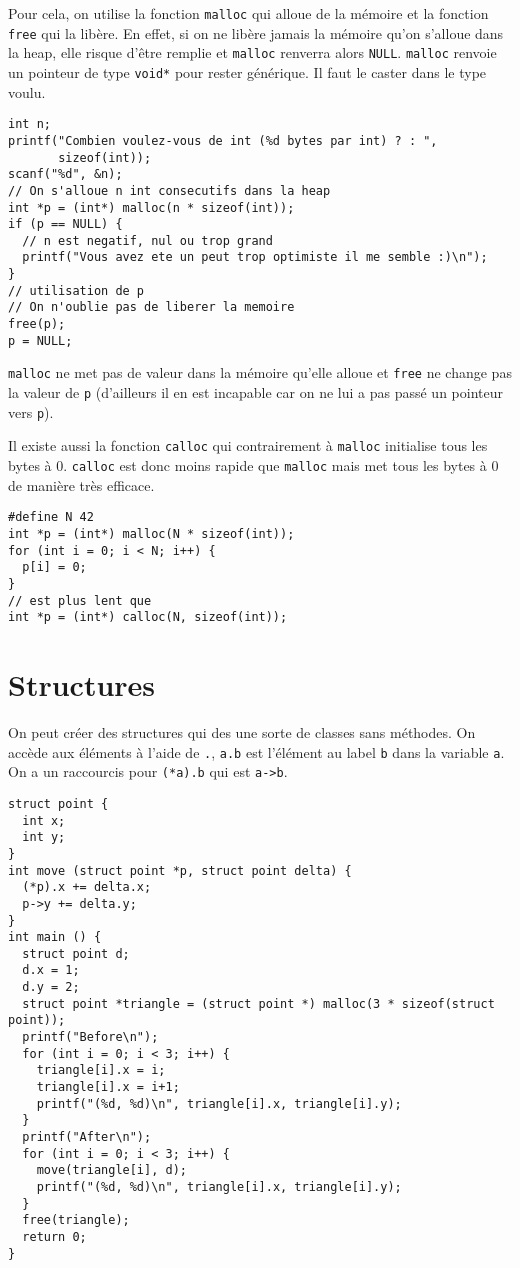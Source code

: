 Pour cela, on utilise la fonction \lstinline|malloc| qui alloue de la mémoire
et la fonction \lstinline|free| qui la libère.
En effet, si on ne libère jamais la mémoire qu'on s'alloue dans la heap,
elle risque d'être remplie et \lstinline|malloc| renverra alors
\lstinline|NULL|.
\lstinline|malloc| renvoie un pointeur de type \lstinline|void*|
pour rester générique.
Il faut le caster dans le type voulu.
\begin{lstlisting}
int n;
printf("Combien voulez-vous de int (%d bytes par int) ? : ",
       sizeof(int));
scanf("%d", &n);
// On s'alloue n int consecutifs dans la heap
int *p = (int*) malloc(n * sizeof(int));
if (p == NULL) {
  // n est negatif, nul ou trop grand
  printf("Vous avez ete un peut trop optimiste il me semble :)\n");
}
// utilisation de p
// On n'oublie pas de liberer la memoire
free(p);
p = NULL;
\end{lstlisting}

\lstinline|malloc| ne met pas de valeur dans la mémoire qu'elle alloue
et \lstinline|free| ne change pas la valeur de \lstinline|p|
(d'ailleurs il en est incapable car on ne lui a pas passé un pointeur
vers \lstinline|p|).

Il existe aussi la fonction \lstinline|calloc| qui contrairement à
\lstinline|malloc| initialise tous les bytes à 0.
\lstinline|calloc| est donc moins rapide que \lstinline|malloc| mais
met tous les bytes à 0 de manière très efficace.
\begin{lstlisting}
#define N 42
int *p = (int*) malloc(N * sizeof(int));
for (int i = 0; i < N; i++) {
  p[i] = 0;
}
// est plus lent que
int *p = (int*) calloc(N, sizeof(int));
\end{lstlisting}

\section{Structures}
On peut créer des structures qui des une sorte de classes sans méthodes.
On accède aux éléments à l'aide de \lstinline|.|, \lstinline|a.b|
est l'élément au label \lstinline|b| dans la variable \lstinline|a|.
On a un raccourcis pour \lstinline|(*a).b| qui est \lstinline|a->b|.
\begin{lstlisting}
struct point {
  int x;
  int y;
}
int move (struct point *p, struct point delta) {
  (*p).x += delta.x;
  p->y += delta.y;
}
int main () {
  struct point d;
  d.x = 1;
  d.y = 2;
  struct point *triangle = (struct point *) malloc(3 * sizeof(struct point));
  printf("Before\n");
  for (int i = 0; i < 3; i++) {
    triangle[i].x = i;
    triangle[i].x = i+1;
    printf("(%d, %d)\n", triangle[i].x, triangle[i].y);
  }
  printf("After\n");
  for (int i = 0; i < 3; i++) {
    move(triangle[i], d);
    printf("(%d, %d)\n", triangle[i].x, triangle[i].y);
  }
  free(triangle);
  return 0;
}
\end{lstlisting}

